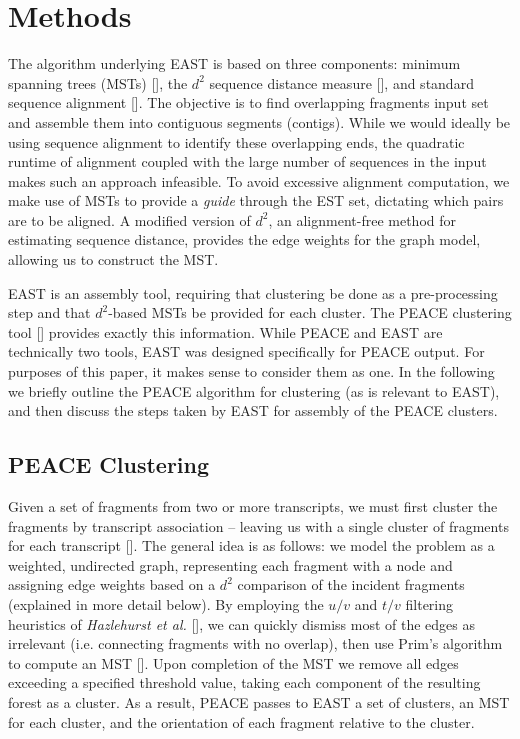 \documentclass{bioinfo}
\newcommand{\peace} {{\small PEACE}}
\newcommand{\east} {{\small EAST}}
\begin{document}
\section*{Methods}

The algorithm underlying \east\/ is based on three components: minimum
spanning trees (MSTs) [\cite{Prim57}], the $d^2$ sequence distance
measure [\cite{Hide94}], and standard sequence alignment
[\cite{Smith81}].  The objective is to find overlapping
fragments input set and assemble them into contiguous segments
(contigs).  While we would ideally be using sequence alignment to
identify these overlapping ends, the quadratic runtime of alignment
coupled with the large number of sequences in the input
makes such an approach infeasible.  To avoid excessive alignment
computation, we make use of MSTs to provide a {\it guide} through the
EST set, dictating which pairs are to be aligned.  A modified version
of $d^2$, an alignment-free method for estimating sequence distance,
provides the edge weights for the graph model, allowing us to
construct the MST.


\east\/ is an assembly tool, requiring that clustering be
done as a pre-processing step and that $d^2$-based
MSTs be provided for each cluster.  The \peace\/
clustering tool [\cite{Rao10}] provides exactly this information.  While
\peace\/ and \east\/ are technically two tools, \east\/ was designed
specifically for \peace\/ output.  For purposes of this paper, it
makes sense to consider them as one.  In the following we briefly
outline the \peace\/ algorithm for clustering (as is relevant to
\east\/), and then discuss the steps taken by \east\/ for assembly of
the \peace\/ clusters.

\subsection*{\peace\/ Clustering}

Given a set of fragments from two or more transcripts, we must first
cluster the fragments by transcript association -- leaving us with a
single cluster of fragments for each transcript [\cite{Rao10}].  The
general idea is as follows: we model the problem as a weighted,
undirected graph, representing each fragment with a node and assigning
edge weights based on a $d^2$ comparison of the incident fragments
(explained in more detail below).  By employing the $u/v$ and $t/v$
filtering heuristics of {\it Hazlehurst et al.} [\cite{Hazelhurst08}],
we can quickly dismiss most of the edges as irrelevant
(i.e. connecting fragments with no overlap), then use Prim's algorithm
to compute an MST [\cite{Prim57}].  Upon completion of the MST we
remove all edges exceeding a specified threshold value, taking each
component of the resulting forest as a cluster.  As a result, \peace\/
passes to \east\/ a set of clusters, an MST for each cluster, and the
orientation of each fragment relative to the cluster.
\end{document}
